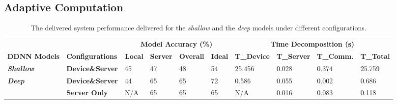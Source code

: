 \documentclass[conference]{IEEEtran}
\begin{document}
\subsection{Adaptive Computation}

    \begin{table}[hbt]
    \centering
    \caption{The delivered system performance delivered for the \emph{shallow} and the \emph{deep} models under different configurations.}
    \label{tab:perfresults}
    \scriptsize{
    \begin{tabular}{ll|llll|llll}
    \multicolumn{2}{l|}{}                                             & \multicolumn{4}{c|}{\textbf{Model Accuracy (\%)}}                          & \multicolumn{4}{c}{\textbf{Time Decomposition (s)}}                                          \\
    \textbf{DDNN Models}                    & \textbf{Configurations} & \textbf{Local} & \textbf{Server} & \textbf{Overall} & \textbf{Ideal} & \textbf{T\_Device} & \textbf{T\_Server} & \textbf{T\_Comm.} & \textbf{T\_Total} \\ \hline\hline

    \textit{\textbf{Shallow}}               & \textbf{Device\&Server} & 45             & 47              & 48               & 54             & 25.456             & 0.028              & 0.374             & 25.759            \\ \hline

    \multirow{2}{*}{\textit{\textbf{Deep}}}
    & \textbf{Device\&Server} & 44             & 65              & 65               & 72             & 0.586              & 0.055              & 0.002            & 0.686             \\ \cline{2-10}
    & \textbf{Server Only}    & N/A            & 65              & 65               & 65             & N/A                & 0.016              & 0.083             & 0.118
    \end{tabular}
    }%
    \end{table}
\end{document}
